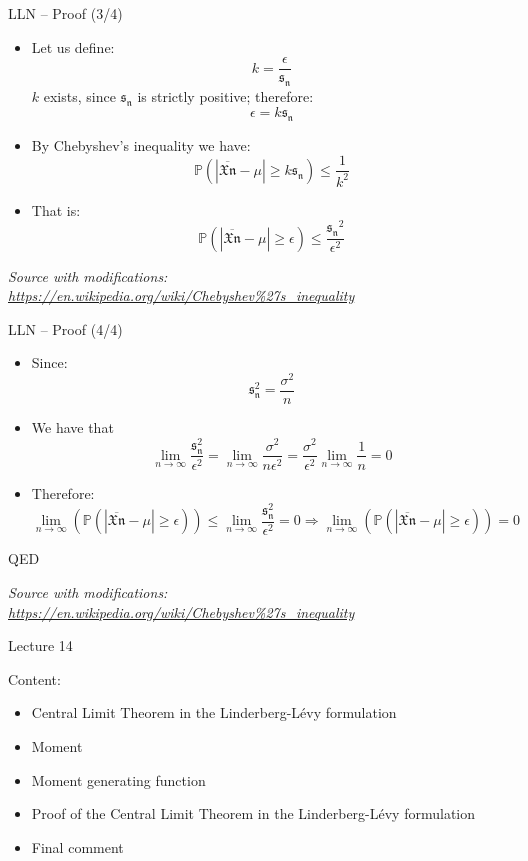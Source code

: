 \documentclass{beamer}
\begin{document}
\begin{frame}
{\centerline{LLN -- Proof (3/4)}}

\begin{itemize}
\item Let us define:\\
$$k = \frac{\epsilon}{\mathfrak{s_n}}$$
$k$ exists, since $\mathfrak{s_n}$ is strictly positive; therefore:
$$\epsilon = k\mathfrak{s_n}$$
\item By Chebyshev's inequality we have:
$$\mathbb{P} ( |\overline{\mathfrak{Xn}} - \mu|  \geq k\mathfrak{s_n}) \leq  \frac{1}{k^2}$$
\item That is:
$$\mathbb{P} ( |\overline{\mathfrak{Xn}} - \mu|  \geq \epsilon) \leq  \frac{\mathfrak{s_n}^2}{\epsilon^2}$$

\end{itemize}


\textit{\small
Source with modifications: \url{https://en.wikipedia.org/wiki/Chebyshev\%27s_inequality}}
\end{frame}

\begin{frame}
{\centerline{LLN -- Proof (4/4)}}

\begin{itemize}

\item Since:
$$  \mathfrak{s_n^2} = \frac{\sigma^2}{n} $$
\item We have that
$$ \lim_{n \to \infty} \frac{\mathfrak{s_n^2}}{\epsilon^2}
= \lim_{n \to \infty} \frac{\sigma^2}{n\epsilon^2}
= \frac{\sigma^2}{\epsilon^2} \lim_{n \to \infty} \frac{1}{n}
= 0$$
\item Therefore:
$$  \lim_{n \to \infty} \left ( \mathbb{P} ( |\overline{\mathfrak{Xn}} - \mu| \geq \epsilon) \right ) \leq  \lim_{n \to \infty} \frac{\mathfrak{s_n^2}}{\epsilon^2} = 0 
\Rightarrow 
\lim_{n \to \infty} \left ( \mathbb{P} ( |\overline{\mathfrak{Xn}} - \mu| \geq \epsilon) \right ) = 0 $$
\end{itemize} 
QED



\textit{\small
Source with modifications: \url{https://en.wikipedia.org/wiki/Chebyshev\%27s_inequality}}
\end{frame}


\begin{frame}
{\centerline{Lecture 14}}

Content:
\begin{itemize}
\item Central Limit Theorem in the Linderberg-L\'{e}vy formulation
\item Moment
\item Moment generating function
\item Proof of the Central Limit Theorem in the Linderberg-L\'{e}vy formulation
\item Final comment
\end{itemize}

\end{frame}
\end{document}
